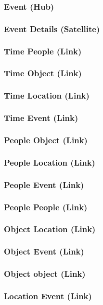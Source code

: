 \documentclass{acm_proc_article-sp}
\begin{document}
\subsubsection{Event (Hub)}
\subsubsection{Event Details (Satellite)}
\subsubsection{Time People (Link)}
\subsubsection{Time Object (Link)}
\subsubsection{Time Location (Link)}
\subsubsection{Time Event (Link)}
\subsubsection{People Object (Link)}
\subsubsection{People Location (Link)}
\subsubsection{People Event (Link)}
\subsubsection{People People (Link)}
\subsubsection{Object Location (Link)}
\subsubsection{Object Event (Link)}
\subsubsection{Object object (Link)}
\subsubsection{Location Event (Link)}
\end{document}
